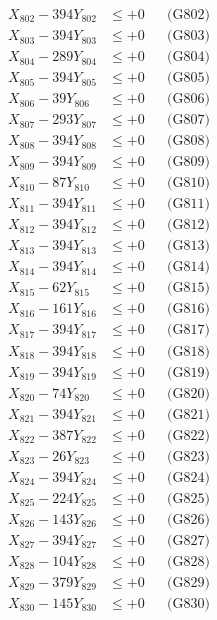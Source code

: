 \documentclass[a4paper,10pt]{article}
\begin{document}
{\begin{align}
X_{802} - 394Y_{802} &\leq +0 && \text{(G802)} \\
X_{803} - 394Y_{803} &\leq +0 && \text{(G803)} \\
X_{804} - 289Y_{804} &\leq +0 && \text{(G804)} \\
X_{805} - 394Y_{805} &\leq +0 && \text{(G805)} \\
X_{806} - 39Y_{806} &\leq +0 && \text{(G806)} \\
X_{807} - 293Y_{807} &\leq +0 && \text{(G807)} \\
X_{808} - 394Y_{808} &\leq +0 && \text{(G808)} \\
X_{809} - 394Y_{809} &\leq +0 && \text{(G809)} \\
X_{810} - 87Y_{810} &\leq +0 && \text{(G810)} \\
\allowbreak
X_{811} - 394Y_{811} &\leq +0 && \text{(G811)} \\
X_{812} - 394Y_{812} &\leq +0 && \text{(G812)} \\
X_{813} - 394Y_{813} &\leq +0 && \text{(G813)} \\
X_{814} - 394Y_{814} &\leq +0 && \text{(G814)} \\
X_{815} - 62Y_{815} &\leq +0 && \text{(G815)} \\
X_{816} - 161Y_{816} &\leq +0 && \text{(G816)} \\
X_{817} - 394Y_{817} &\leq +0 && \text{(G817)} \\
X_{818} - 394Y_{818} &\leq +0 && \text{(G818)} \\
X_{819} - 394Y_{819} &\leq +0 && \text{(G819)} \\
X_{820} - 74Y_{820} &\leq +0 && \text{(G820)} \\
\allowbreak
X_{821} - 394Y_{821} &\leq +0 && \text{(G821)} \\
X_{822} - 387Y_{822} &\leq +0 && \text{(G822)} \\
X_{823} - 26Y_{823} &\leq +0 && \text{(G823)} \\
X_{824} - 394Y_{824} &\leq +0 && \text{(G824)} \\
X_{825} - 224Y_{825} &\leq +0 && \text{(G825)} \\
X_{826} - 143Y_{826} &\leq +0 && \text{(G826)} \\
X_{827} - 394Y_{827} &\leq +0 && \text{(G827)} \\
X_{828} - 104Y_{828} &\leq +0 && \text{(G828)} \\
X_{829} - 379Y_{829} &\leq +0 && \text{(G829)} \\
X_{830} - 145Y_{830} &\leq +0 && \text{(G830)} \\

\end{align}}
\end{document}
